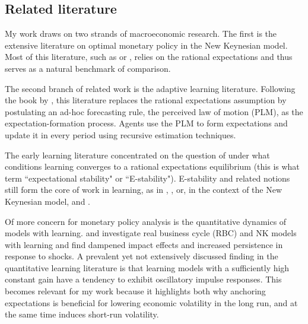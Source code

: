 \documentclass[11pt]{article}
\renewcommand{\[}{\begin{equation}}
\renewcommand{\]}{\end{equation}}
\begin{document}
\subsection{Related literature}
My work draws on two strands of macroeconomic research. The first is the extensive literature on optimal monetary policy in the New Keynesian model. Most of this literature, such as \cite{clarida1999science} or \cite{woodford2011interest}, relies on the rational expectations and thus serves as a natural benchmark of comparison. 

The second branch of related work is the adaptive learning literature. Following the book by \cite{evans_honkapohja2001}, this literature replaces the rational expectations assumption by postulating an ad-hoc forecasting rule, the perceived law of motion (PLM), as the expectation-formation process. Agents use the PLM to form expectations and update it in every period using recursive estimation techniques. 

The early learning literature concentrated on the question of under what conditions learning converges to a rational expectations equilibrium (this is what \cite{evans_honkapohja2001} term ``expectational stability" or ``E-stability"). E-stability and related notions still form the core of work in learning, as in \cite{ferrero2007monetary}, \cite{eusepi2018science}, or, in the context of the New Keynesian model, \cite{bullard2002learning} and \cite{preston2005}.

Of more concern for monetary policy analysis is the quantitative dynamics of models with learning. \cite{williams2003adaptive} and \cite{eusepi2011expectations} investigate real business cycle (RBC) and NK models with learning and find dampened impact effects and increased persistence in response to shocks. A prevalent yet not extensively discussed finding in the quantitative learning literature is that learning models with a sufficiently high constant gain have a tendency to exhibit oscillatory impulse responses. This becomes relevant for my work because it highlights both why anchoring expectations is beneficial for lowering economic volatility in the long run, and at the same time induces short-run volatility.
\end{document}

